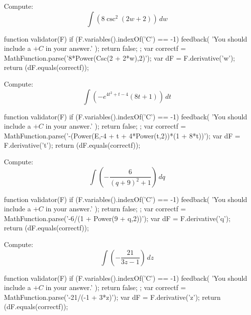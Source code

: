 \documentclass{ximera}
\renewcommand{\d}{\, d}
\begin{document}
\begin{exercise}
Compute: 
\[
\int \left(8 \csc ^2(2 w+2)\right)\d w
\]
\begin{expressionAnswer}
     function validator(F) {
      if (F.variables().indexOf('C') == -1) {
        feedback( 'You should include a $+C$ in your answer.' );
        return false;
      };      
      var correctf = MathFunction.parse('8*Power(Csc(2 + 2*w),2)');
      var dF = F.derivative('w');
      return (dF.equals(correctf));
    }
\end{expressionAnswer}
\end{exercise}



\begin{exercise}
Compute: 
\[
\int \left(-e^{4 t^2+t-4} (8 t+1)\right)\d t
\]
\begin{expressionAnswer}
     function validator(F) {
      if (F.variables().indexOf('C') == -1) {
        feedback( 'You should include a $+C$ in your answer.' );
        return false;
      };      
      var correctf = MathFunction.parse('-(Power(E,-4 + t + 4*Power(t,2))*(1 + 8*t))');
      var dF = F.derivative('t');
      return (dF.equals(correctf));
    }
\end{expressionAnswer}
\end{exercise}



\begin{exercise}
Compute: 
\[
\int \left(-\frac{6}{(q+9)^2+1}\right)\d q
\]
\begin{expressionAnswer}
     function validator(F) {
      if (F.variables().indexOf('C') == -1) {
        feedback( 'You should include a $+C$ in your answer.' );
        return false;
      };      
      var correctf = MathFunction.parse('-6/(1 + Power(9 + q,2))');
      var dF = F.derivative('q');
      return (dF.equals(correctf));
    }
\end{expressionAnswer}
\end{exercise}



\begin{exercise}
Compute: 
\[
\int \left(-\frac{21}{3 z-1}\right)\d z
\]
\begin{expressionAnswer}
     function validator(F) {
      if (F.variables().indexOf('C') == -1) {
        feedback( 'You should include a $+C$ in your answer.' );
        return false;
      };      
      var correctf = MathFunction.parse('-21/(-1 + 3*z)');
      var dF = F.derivative('z');
      return (dF.equals(correctf));
    }
\end{expressionAnswer}
\end{exercise}
\end{document}
